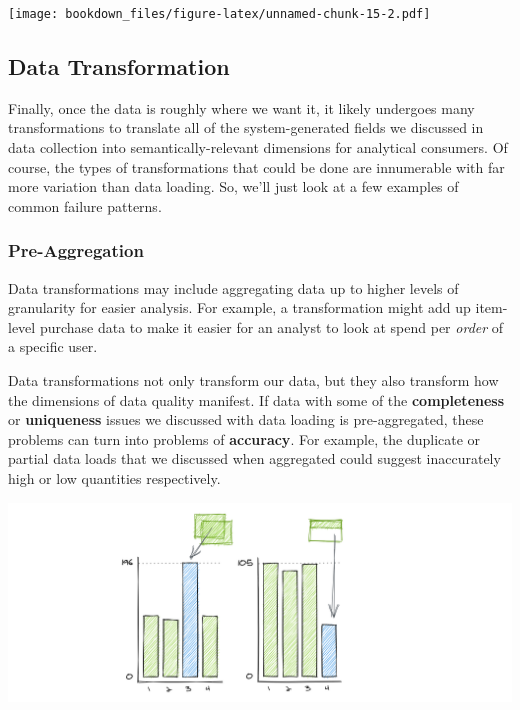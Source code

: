 \documentclass[
]{krantz}
\begin{document}
\texttt{[image: bookdown\_files/figure-latex/unnamed-chunk-15-2.pdf]}

\hypertarget{data-transformation}{%
\subsection{Data Transformation}\label{data-transformation}}

Finally, once the data is roughly where we want it, it likely undergoes many transformations to translate all of the system-generated fields we discussed in data collection into semantically-relevant dimensions for analytical consumers. Of course, the types of transformations that could be done are innumerable with far more variation than data loading. So, we'll just look at a few examples of common failure patterns.

\hypertarget{pre-aggregation}{%
\subsubsection{Pre-Aggregation}\label{pre-aggregation}}

Data transformations may include aggregating data up to higher levels of granularity for easier analysis. For example, a transformation might add up item-level purchase data to make it easier for an analyst to look at spend per \emph{order} of a specific user.

Data transformations not only transform our data, but they also transform how the dimensions of data quality manifest. If data with some of the \textbf{completeness} or \textbf{uniqueness} issues we discussed with data loading is pre-aggregated, these problems can turn into problems of \textbf{accuracy}. For example, the duplicate or partial data loads that we discussed when aggregated could suggest inaccurately high or low quantities respectively.

\begin{center}\includegraphics[width=0.9\linewidth]{figures/data-dall/completeness-accuracy} \end{center}
\end{document}
